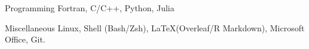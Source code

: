 

\begin{cvskills}

  \cvskill
    {Programming} %
    {Fortran, C/C++, Python, Julia} %

  \cvskill
    {Miscellaneous} %
    {Linux, Shell (Bash/Zsh), \LaTeX (Overleaf/R Markdown), Microsoft Office, Git.} %

\end{cvskills}

